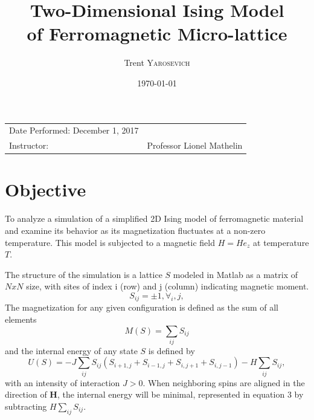 \documentclass{article}
\title{Two-Dimensional Ising Model \\ of Ferromagnetic Micro-lattice} %
\author{Trent \textsc{Yarosevich}} %
\date{\today} %
\begin{document}
\maketitle %
\setlength\parindent{1cm}

\begin{center}
\begin{tabular}{l r}
Date Performed: December 1, 2017 \\ %
Instructor: & Professor Lionel Mathelin %
\end{tabular}
\end{center}



\section{Objective}

To analyze a simulation of a simplified 2D Ising model of ferromagnetic material and examine its behavior as its magnetization fluctuates at a non-zero temperature. This model is subjected to a magnetic field $H = H e_z$ at temperature $T$.



\noindent The structure of the simulation is a lattice $S$ modeled in Matlab as a matrix of $NxN$ size, with sites of index i (row) and j (column) indicating magnetic moment.
\begin{equation}
S_{ij} = \pm 1, \forall_i, j,
\end{equation}
The magnetization for any given configuration is defined as the sum of all elements
\begin{equation}
M(S) = \sum_{ij} S_{ij}
\end{equation}
and the internal energy of any state $S$ is defined by
\begin{equation}
U(S) = -J\sum_{ij} S_{ij}(S_{i+1, j} + S_{i-1, j} + S_{i,j+1} + S_{i,j-1}) - H\sum_{ij} S_{ij},
\end{equation}
with an intensity of interaction $J > 0.$ When neighboring spins are aligned in the direction of $\textbf{H}$, the internal energy will be minimal, represented in equation 3 by subtracting $H\sum_{ij}S_{ij}.$ \newline
\end{document}
